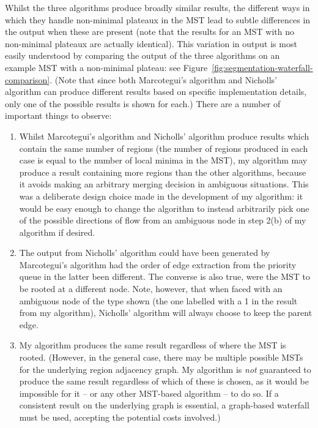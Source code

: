Whilst the three algorithms produce broadly similar results, the different ways in which they handle non-minimal plateaux in the MST lead to subtle differences in the output when these are present (note that the results for an MST with no non-minimal plateaux are actually identical). This variation in output is most easily understood by comparing the output of the three algorithms on an example MST with a non-minimal plateau: see Figure~\ref{fig:segmentation-waterfall-comparison}. (Note that since both Marcotegui's algorithm and Nicholls' algorithm can produce different results based on specific implementation details, only one of the possible results is shown for each.) There are a number of important things to observe:
%
\begin{enumerate}

\item Whilst Marcotegui's algorithm and Nicholls' algorithm produce results which contain the same number of regions (the number of regions produced in each case is equal to the number of local minima in the MST), my algorithm may produce a result containing more regions than the other algorithms, because it avoids making an arbitrary merging decision in ambiguous situations. This was a deliberate design choice made in the development of my algorithm: it would be easy enough to change the algorithm to instead arbitrarily pick one of the possible directions of flow from an ambiguous node in step 2(b) of my algorithm if desired.

\item The output from Nicholls' algorithm could have been generated by Marcotegui's algorithm had the order of edge extraction from the priority queue in the latter been different. The converse is also true, were the MST to be rooted at a different node. Note, however, that when faced with an ambiguous node of the type shown (the one labelled with a 1 in the result from my algorithm), Nicholls' algorithm will always choose to keep the parent edge.

\item My algorithm produces the same result regardless of where the MST is rooted. (However, in the general case, there may be multiple possible MSTs for the underlying region adjacency graph. My algorithm is \emph{not} guaranteed to produce the same result regardless of which of these is chosen, as it would be impossible for it -- or any other MST-based algorithm -- to do so. If a consistent result on the underlying graph is essential, a graph-based waterfall must be used, accepting the potential costs involved.)

\end{enumerate}


